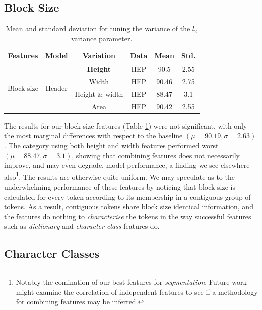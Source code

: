 \subsection{Block Size}

\begin{table}[h]
\begin{center}
\begin{tabular}{|c|c|c|c|c|c|}
\hline
Features & Model & Variation & Data & Mean & Std.\\
\hline
\multirow{4}{*}{Block size} & \multirow{4}{*}{Header} & \textbf{Height} & HEP & 90.5 & 2.55\\\cline{3-6}
& & Width & HEP & 90.46 & 2.75\\\cline{3-6}
& & Height \& width & HEP  & 88.47 & 3.1\\\cline{3-6}
& & Area & HEP  & 90.42 & 2.55\\\cline{3-6}
\hline
\end{tabular}
\caption[Mean and standard deviation for subsampling CORA data set.]{Mean and standard deviation for tuning the variance of the $l_2$ variance parameter.}
\label{table:blockshaperesults}
\end{center}
\end{table}

The results for our block size features (Table \ref{table:blockshaperesults}) were not significant, with only the most marginal differences with respect to the baseline $(\mu = 90.19, \sigma = 2.63)$. The category using both height and width features performed worst $(\mu = 88.47, \sigma = 3.1)$, showing that combining features does not necessarily improve, and may even degrade, model performance, a finding we see elsewhere also\footnote{Notably the comination of our best features for \emph{segmentation}. Future work might examine the correlation of independent features to see if a methodology for combining features may be inferred.}. The results are otherwise quite uniform. We may speculate as to the underwhelming performance of these features by noticing that block size is calculated for every token according to its membership in a contiguous group of tokens. As a result, contiguous tokens share block size identical information, and the features do nothing to \emph{characterise} the tokens in the way successful features such as \emph{dictionary} and \emph{character class} features do.

\subsection{Character Classes}

